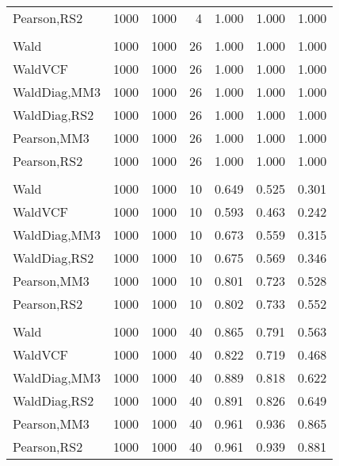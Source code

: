 \documentclass[
]{article}
\begin{document}
\begin{table}[H]
{\begin{tabular}[t]{lrrrrrr}
\hspace{1em}Pearson,RS2 & 1000 & 1000 & 4 & 1.000 & 1.000 & 1.000\\
\addlinespace[0.3em]
\multicolumn{7}{l}{\textbf{1F 15V}}\\
\hspace{1em}Wald & 1000 & 1000 & 26 & 1.000 & 1.000 & 1.000\\
\hspace{1em}WaldVCF & 1000 & 1000 & 26 & 1.000 & 1.000 & 1.000\\
\hspace{1em}WaldDiag,MM3 & 1000 & 1000 & 26 & 1.000 & 1.000 & 1.000\\
\hspace{1em}WaldDiag,RS2 & 1000 & 1000 & 26 & 1.000 & 1.000 & 1.000\\
\hspace{1em}Pearson,MM3 & 1000 & 1000 & 26 & 1.000 & 1.000 & 1.000\\
\hspace{1em}Pearson,RS2 & 1000 & 1000 & 26 & 1.000 & 1.000 & 1.000\\
\addlinespace[0.3em]
\multicolumn{7}{l}{\textbf{2F 10V}}\\
\hspace{1em}Wald & 1000 & 1000 & 10 & 0.649 & 0.525 & 0.301\\
\hspace{1em}WaldVCF & 1000 & 1000 & 10 & 0.593 & 0.463 & 0.242\\
\hspace{1em}WaldDiag,MM3 & 1000 & 1000 & 10 & 0.673 & 0.559 & 0.315\\
\hspace{1em}WaldDiag,RS2 & 1000 & 1000 & 10 & 0.675 & 0.569 & 0.346\\
\hspace{1em}Pearson,MM3 & 1000 & 1000 & 10 & 0.801 & 0.723 & 0.528\\
\hspace{1em}Pearson,RS2 & 1000 & 1000 & 10 & 0.802 & 0.733 & 0.552\\
\addlinespace[0.3em]
\multicolumn{7}{l}{\textbf{3F 15V}}\\
\hspace{1em}Wald & 1000 & 1000 & 40 & 0.865 & 0.791 & 0.563\\
\hspace{1em}WaldVCF & 1000 & 1000 & 40 & 0.822 & 0.719 & 0.468\\
\hspace{1em}WaldDiag,MM3 & 1000 & 1000 & 40 & 0.889 & 0.818 & 0.622\\
\hspace{1em}WaldDiag,RS2 & 1000 & 1000 & 40 & 0.891 & 0.826 & 0.649\\
\hspace{1em}Pearson,MM3 & 1000 & 1000 & 40 & 0.961 & 0.936 & 0.865\\
\hspace{1em}Pearson,RS2 & 1000 & 1000 & 40 & 0.961 & 0.939 & 0.881\\
\bottomrule
\end{tabular}}
\endgroup{}
\end{table}
\end{document}
